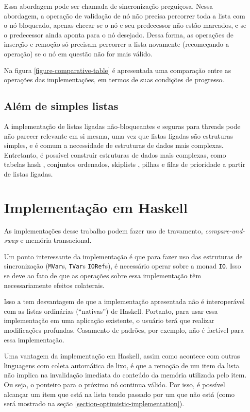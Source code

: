 \documentclass[a4paper,12pt,oldfontcommands]{abntex2}
\begin{document}
Essa abordagem pode ser chamada de sincronização preguiçosa. Nessa abordagem, a operação de validação de nó não precisa percorrer toda a lista com o nó bloqueado, apenas checar se o nó e seu predecessor não estão marcados, e se o predecessor ainda aponta para o nó desejado. Dessa forma, as operações de inserção e remoção só precisam percorrer a lista novamente (recomeçando a operação) se o nó em questão não for mais válido.

Na figura \ref{figure-comparative-table} é apresentada uma comparação entre as operações das implementações, em termos de suas condições de progresso.

\section{Além de simples listas}

A implementação de listas ligadas não-bloqueantes e seguras para threads pode não parecer relevante em si mesma, uma vez que listas ligadas são estruturas simples, e é comum a necessidade de estruturas de dados mais complexas. Entretanto, é possível construir estruturas de dados mais complexas, como tabelas hash \cite{duarte2016concurrent}, conjuntos ordenados, skiplists \cite{herlihy2011art}, pilhas e filas de prioridade a partir de listas ligadas.

\chapter{Implementação em Haskell}\label{chapter-implementation}

As implementações desse trabalho podem fazer uso de travamento, \textit{compare-and-swap} e memória transacional.

Um ponto interessante da implementação é que para fazer uso das estruturas de sincronização (\texttt{MVar}s, \texttt{TVar}s \texttt{IORef}s), é necessário operar sobre a monad \texttt{IO}. Isso se deve ao fato de que as operações sobre essa implementação têm necessariamente efeitos colaterais.

Isso a tem desvantagem de que a implementação apresentada não é interoperável com as listas ordinárias (``nativas'') de Haskell. Portanto, para usar essa implementação em uma aplicação existente, o usuário terá que realizar modificações profundas. Casamento de padrões, por exemplo, não é factível para essa implementação.

Uma vantagem da implementação em Haskell, assim como acontece com outras linguagens com coleta automática de lixo, é que a remoção de um item da lista não implica na invalidação imediata do conteúdo da memória utilizada pelo item. Ou seja, o ponteiro para o próximo nó continua válido. Por isso, é possível alcançar um item que está na lista tendo passado por um que não está (como será mostrado na seção \ref{section-optimistic-implementation}).
\end{document}
